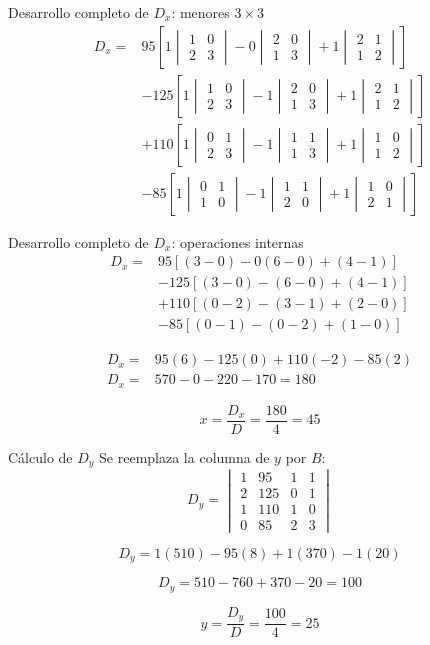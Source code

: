 \documentclass[aspectratio=169]{beamer}
\newcommand{\detm}[1]{\begin{vmatrix}#1\end{vmatrix}}
\begin{document}
\begin{frame}[shrink=17]{Desarrollo completo de $D_x$: menores $3\times3$}
\[
\begin{aligned}
D_x={}&95\left[1\detm{1&0\\2&3}-0\detm{2&0\\1&3}+1\detm{2&1\\1&2}\right]\\
&-125\left[1\detm{1&0\\2&3}-1\detm{2&0\\1&3}+1\detm{2&1\\1&2}\right]\\
&+110\left[1\detm{0&1\\2&3}-1\detm{1&1\\1&3}+1\detm{1&0\\1&2}\right]\\
&-85\left[1\detm{0&1\\1&0}-1\detm{1&1\\2&0}+1\detm{1&0\\2&1}\right]
\end{aligned}
\]
\end{frame}

\begin{frame}[shrink=13]{Desarrollo completo de $D_x$: operaciones internas}
\[
\begin{aligned}
D_x={}&95[(3-0)-0(6-0)+(4-1)]\\
&-125[(3-0)-(6-0)+(4-1)]\\
&+110[(0-2)-(3-1)+(2-0)]\\
&-85[(0-1)-(0-2)+(1-0)]
\end{aligned}
\]

\[
\begin{aligned}
D_x={}&95(6)-125(0)+110(-2)-85(2)\\
D_x={}&570-0-220-170=\boxed{180}
\end{aligned}
\]

\[
x=\frac{D_x}{D}=\frac{180}{4}=\boxed{45}
\]
\end{frame}


\begin{frame}[shrink=8]{Cálculo de $D_y$}
Se reemplaza la columna de $y$ por $B$:
\[
D_y=\detm{
1&95&1&1\\
2&125&0&1\\
1&110&1&0\\
0&85&2&3}
\]

\[
D_y=1(510)-95(8)+1(370)-1(20)
\]

\[
D_y=510-760+370-20=\boxed{100}
\]

\[
y=\frac{D_y}{D}=\frac{100}{4}=\boxed{25}
\]
\end{frame}
\end{document}
